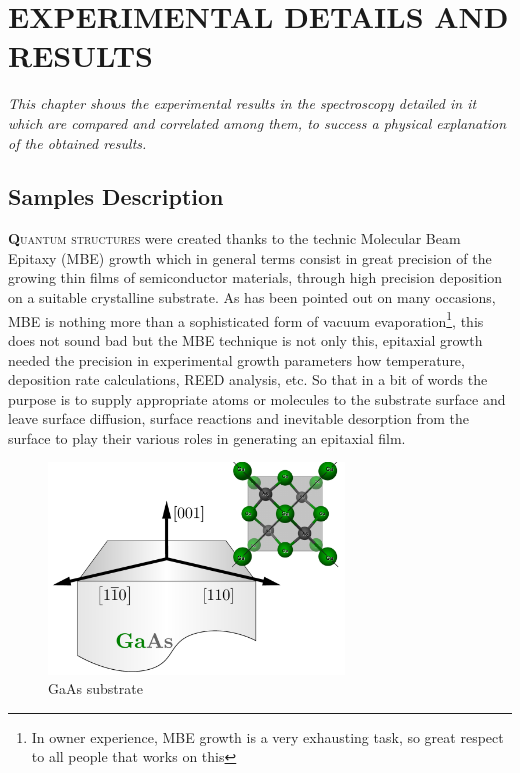 \chapter{EXPERIMENTAL DETAILS AND  RESULTS }
\label{chap:experimentals-details-and-results}
\textit{This chapter shows the experimental results in the spectroscopy detailed in it which are compared and correlated among them, to success a physical explanation of the obtained results.}
\vfill
\minitoc
\newpage

\section{Samples Description}
\label{sec:chapter-3-section-samples-description}
\vspace{-10mm}
\lettrine[lines=3, lraise=.1, nindent=0mm, slope=0mm]{\textbf{Q}}{uantum structures} were created thanks to the technic Molecular Beam Epitaxy (MBE) growth which in general terms consist in great precision of the growing thin films of semiconductor materials, through high precision  deposition on a suitable  crystalline substrate. As has been pointed out on many occasions, MBE  is nothing more than a sophisticated form of vacuum evaporation\footnote{In owner  experience, MBE growth is a very exhausting task, so great respect to all people that works on this}\cite{orton2015molecular}, this does not sound bad but the MBE technique is not only this, epitaxial growth needed  the precision in experimental  growth parameters how temperature, deposition rate calculations, REED analysis, etc. So that in a bit of words the purpose is to  supply appropriate atoms or molecules to the substrate surface and leave surface diffusion, surface reactions and inevitable desorption from the surface to play their various roles in generating an epitaxial film\cite{orton2015molecular,grundmann2010physics}. 

\begin{figure}[H]
	\centering
	\includegraphics[width=0.7\textwidth]{../figures/chapter-3/crystal-1/build/crystal-1.pdf}
	\caption[GaAs substrate growth direction]{GaAs substrate}
	\label{fig:chapter-3 GaAs Substrate}
\end{figure}

